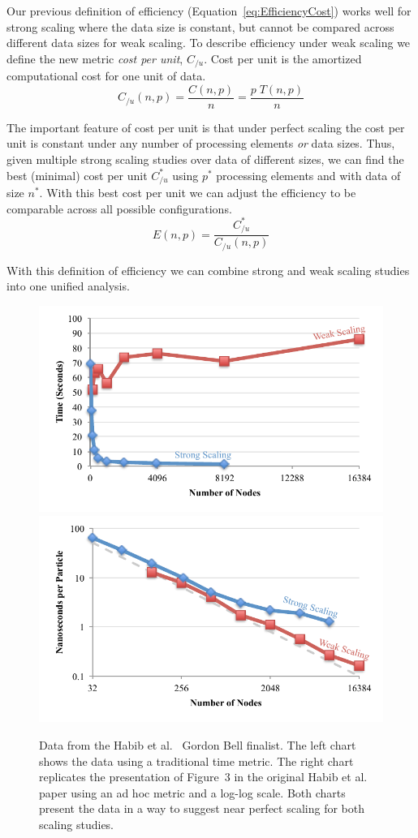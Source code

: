 \documentclass[conference]{IEEEtran}
\newcommand*{\scite}[1]{~\cite{#1}}
\newcommand{\etal}{et al.\xspace}
\newcommand*{\keyterm}[1]{\emph{#1}}
\begin{document}
\noindent
Our previous definition of efficiency (Equation~\ref{eq:EfficiencyCost})
works well for strong scaling where the data size is constant, but cannot
be compared across different data sizes for weak scaling. To describe
efficiency under weak scaling we define the new metric \keyterm{cost per
  unit}, $C_{/u}$. Cost per unit is the amortized computational cost for
one unit of data.
\begin{equation}
  C_{/u}(n,p) = \frac{C(n,p)}{n} = \frac{p \; T(n,p)}{n}
  \label{eq:CostPerUnit}
\end{equation}

The important feature of cost per unit is that under perfect scaling the
cost per unit is constant under any number of processing elements \emph{or}
data sizes. Thus, given multiple strong scaling studies over data of
different sizes, we can find the best (minimal) cost per unit $C_{/u}^*$
using $p^*$ processing elements and with data of size $n^*$. With this best
cost per unit we can adjust the efficiency to be comparable across all
possible configurations.
\begin{equation}
  E(n,p) = \frac{C_{/u}^*}{C_{/u}(n,p)}
  \label{eq:EfficiencyCostPerUnit}
\end{equation}

With this definition of efficiency we can combine strong and weak scaling
studies into one unified analysis.


\begin{figure}
  \includegraphics[width=.5\linewidth]{images/HabibTime}%
  \includegraphics[width=.5\linewidth]{images/HabibTimePerParticle}
  \caption{Data from the Habib \etal\scite{Habib2013} Gordon Bell
    finalist. The left chart shows the data using a traditional time
    metric. The right chart replicates the presentation of Figure~3 in the
    original Habib \etal paper using an ad hoc metric and a log-log
    scale. Both charts present the data in a way to suggest near perfect
    scaling for both scaling studies.}
  \label{fig:HabibTraditional}
\end{figure}
\end{document}
